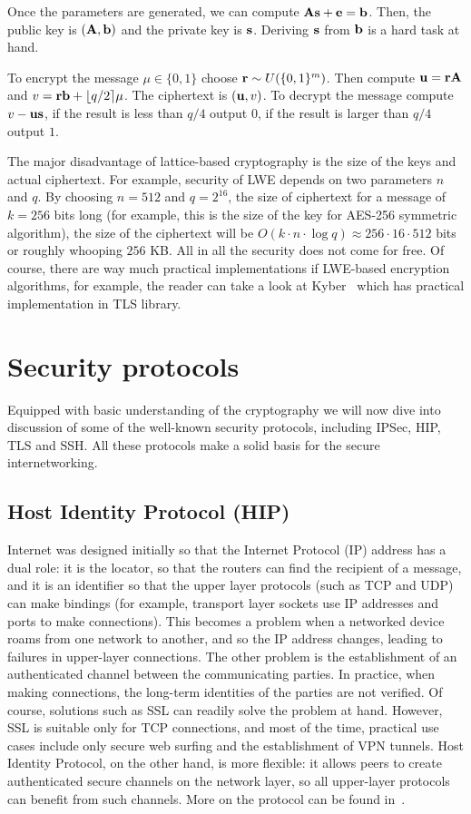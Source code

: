 Once the parameters are generated, we can compute ${\bf As}+{\bf e} = {\bf b}$. Then, the public 
key is $({\bf A, b})$ and the private key is ${\bf s}$. Deriving ${\bf s}$ from ${\bf b}$ is a hard 
task at hand.

To encrypt the message $\mu \in \{0, 1\}$ choose ${\bf r} \sim U(\{0, 1\}^m)$. Then compute ${\bf u}={\bf rA}$ and 
$v={\bf rb}+\lfloor q/2 \rceil \mu$. The ciphertext is $({\bf u}, v)$. To decrypt the message 
compute $v - \bf{u s}$, if the result is less than $q/4$ output $0$, if the result
is larger than $q/4$ output $1$. 

The major disadvantage of lattice-based cryptography is the size of the keys and actual ciphertext. For example,
security of LWE depends on two parameters $n$ and $q$. By choosing $n=512$ and $q=2^{16}$, the size of ciphertext
for a message of $k=256$ bits long (for example, this is the size of the key for AES-256 symmetric algorithm), 
the size of the ciphertext will be $O(k \cdot n \cdot \log q) \approx 256 \cdot 16 \cdot 512$ bits or roughly whooping 
$256$ KB. All in all the security does not come for free. Of course, there are way much practical implementations
if LWE-based encryption algorithms, for example, the reader can take a look at Kyber~\cite{} which has practical 
implementation in TLS library.

\section{Security protocols}

Equipped with basic understanding of the cryptography we will now dive into discussion of some 
of the well-known security protocols, including IPSec, HIP, TLS and SSH. All these protocols
make a solid basis for the secure internetworking.

\subsection{Host Identity Protocol (HIP)}

Internet was designed initially so that the Internet Protocol (IP) address has a dual role: it 
is the locator, so that the routers can find the recipient of a message, and it is an identifier 
so that the upper layer protocols (such as TCP and UDP) can make bindings (for example, transport 
layer sockets use IP addresses and ports to make connections). This becomes a problem when a networked 
device roams from one network to another, and so the IP address changes, leading to failures in 
upper-layer connections. The other problem is the establishment of an authenticated channel between 
the communicating parties. In practice, when making connections, the long-term identities of the parties 
are not verified. Of course, solutions such as SSL can readily solve the problem at hand. However, SSL 
is suitable only for TCP connections, and most of the time, practical use cases include only secure web 
surfing and the establishment of VPN tunnels. Host Identity Protocol, on the other hand, is more flexible: 
it allows peers to create authenticated secure channels on the network layer, so all upper-layer protocols 
can benefit from such channels. More on the protocol can be found in~\cite{gurtov:hip}.

